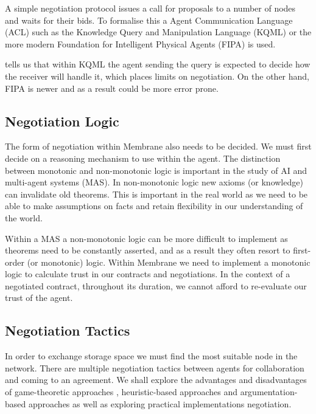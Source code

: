 \documentclass[11pt, a4paper, twoside]{report}
\begin{document}
A simple negotiation protocol issues a call for proposals to a number of nodes and waits for their bids. To formalise this a Agent Communication Language (ACL) such as the Knowledge Query and Manipulation Language (KQML) \citep{finin1992specification} or the more modern Foundation for Intelligent Physical Agents (FIPA) \citep{fipa2002fipa} is used.

\citep{rahwan2005interest} \cite{beer1999negotiation} tells us that within KQML the agent sending the query is expected to decide how the receiver will handle it, which places limits on negotiation. On the other hand, FIPA is newer and as a result could be more error prone.

\subsection{Negotiation Logic}

The form of negotiation within Membrane also needs to be decided. We must first decide on a reasoning mechanism to use within the agent. The distinction between monotonic and non-monotonic logic is important in the study of AI and multi-agent systems (MAS). In non-monotonic logic new axioms (or knowledge) can invalidate old theorems. \citep*{mcdermott1980non, antonelli2008non} This is important in the real world as we need to be able to make assumptions on facts and retain flexibility in our understanding of the world.

Within a MAS a non-monotonic logic can be more difficult to implement as theorems need to be constantly asserted, and as a result they often resort to first-order (or monotonic) logic. Within Membrane we need to implement a monotonic logic to calculate trust in our contracts and negotiations. In the context of a negotiated contract, throughout its duration, we cannot afford to re-evaluate our trust of the agent.

\subsection{Negotiation Tactics}

In order to exchange storage space we must find the most suitable node in the network. There are multiple negotiation tactics between agents for collaboration and coming to an agreement. \citep{beer1999negotiation} We shall explore the advantages and disadvantages of game-theoretic approaches \citep*{rosenschein1994rules, kraus2001strategic, sandholm2002algorithm}, heuristic-based approaches \citep*{faratin2000automated, fatima2002multi} and argumentation-based approaches \citep*{kraus1998reaching, jennings1998argumentation} as well as exploring practical implementations negotiation.
\end{document}

